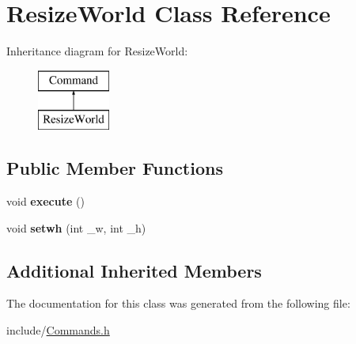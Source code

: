 \hypertarget{classResizeWorld}{\section{Resize\-World Class Reference}
\label{classResizeWorld}
}
Inheritance diagram for Resize\-World\-:\begin{figure}[H]
\begin{center}
\leavevmode
\includegraphics[height=2.000000cm]{classResizeWorld}
\end{center}
\end{figure}
\subsection*{Public Member Functions}
\begin{DoxyCompactItemize}
\item 
\hypertarget{classResizeWorld_a0bad6f46ac6678ed0ad50e572a4b652d}{void {\bfseries execute} ()}\label{classResizeWorld_a0bad6f46ac6678ed0ad50e572a4b652d}

\item 
\hypertarget{classResizeWorld_aa531e8ae72ef075cac5c7641572bfc35}{void {\bfseries setwh} (int \-\_\-w, int \-\_\-h)}\label{classResizeWorld_aa531e8ae72ef075cac5c7641572bfc35}

\end{DoxyCompactItemize}
\subsection*{Additional Inherited Members}


The documentation for this class was generated from the following file\-:\begin{DoxyCompactItemize}
\item 
include/\hyperlink{Commands_8h}{Commands.\-h}\end{DoxyCompactItemize}
